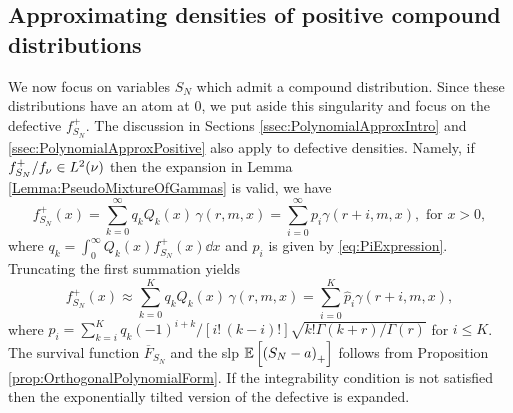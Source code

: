 \subsection{Approximating densities of positive compound distributions}
We now focus on variables $S_N$ which admit a compound distribution. Since these distributions have an atom at 0, we put aside this singularity and focus on the defective \pdf $f_{S_N}^+$. The discussion in Sections \ref{ssec:PolynomialApproxIntro} and \ref{ssec:PolynomialApproxPositive} also apply to defective densities. Namely, if $f_{S_N}^{+}/f_\nu\in L^2(\nu)$ then the expansion in Lemma \ref{Lemma:PseudoMixtureOfGammas} is valid, we have
\begin{equation*}\label{eq:PseudoErlangMixtureRepresentationDefectivePDF}
f_{S_N}^+(x)= \sum_{k=0}^\infty q_k Q_k(x) \, \gamma(r, m, x) = \sum_{i=0}^{\infty} p_i \gamma(r+i,m,x),\text{ for }x>0,
\end{equation*}
where $q_k=\int_{0}^{\infty}Q_{k}(x)f_{S_N}^+(x)\dd x$ and $p_i$ is given by \eqref{eq:PiExpression}.
Truncating the first summation yields
\begin{equation*}\label{eq:ApproxPolynomialRepresentation}
f_{S_N}^{+}(x)
\approx \sum_{k=0}^{K} q_k Q_{k}(x) \, \gamma(r,m,x)
= \sum_{i=0}^{K} \widehat{p}_i\gamma(r+i,m,x),
\end{equation*}
where $\widehat{p}_i =\sum_{k=i}^K q_k (-1)^{i+k} / [i! \, (k-i)! ] \sqrt{k! \Gamma(k+r) / \Gamma(r)}$ for $i \le K$. The survival function $\overline{F}_{S_N}$ and the slp $\mathbb E\left[\left(S_N-a\right)_{+}\right]$ follows from Proposition \ref{prop:OrthogonalPolynomialForm}. If the integrability condition is not satisfied then the exponentially tilted version of the defective \pdf is expanded.

